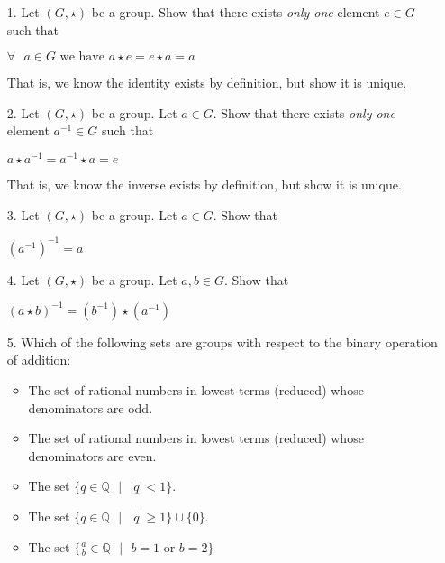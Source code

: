 \documentclass{article}
\begin{document}
  \begin{itemize}
  \item [1.] Let $(G,\star)$ be a group. Show that there exists \emph{only one} element $e\in{G}$ such that
    \begin{center}
      $\forall\text{ }a\in{G}\text{ we have }a\star{e}=e\star{a}=a$
    \end{center}
    That is, we know the identity exists by definition, but show it is unique.
  \item[2.] Let $(G, \star)$ be a group. Let $a\in{G}$. Show that there exists \emph{only one} element $a^{-1}\in{G}$ such that
    \begin{center}
      $a\star a^{-1} = a^{-1}\star {a} = e$
    \end{center}
    That is, we know the inverse exists by definition, but show it is unique.
  \item [3.] Let $(G, \star)$ be a group. Let $a\in{G}$. Show that
    \begin{center}
      $(a^{-1})^{-1} = a$
    \end{center}
  \item [4.] Let $(G, \star)$ be a group. Let $a,b\in{G}$. Show that
    \begin{center}
      $(a\star{b})^{-1} = (b^{-1})\star(a^{-1})$
    \end{center}
  \item [5.] Which of the following sets are groups with respect to the binary operation of addition:
    \begin{itemize}
    \item The set of rational numbers in lowest terms (reduced) whose denominators are odd.
    \item The set of rational numbers in lowest terms (reduced) whose denominators are even.
    \item The set $\{q\in\mathbb{Q}\text{ }\vert\text{ }|q| < 1\}$.
    \item The set $\{q\in\mathbb{Q}\text{ }\vert\text{ }|q| \ge 1\} \cup \{0\}$.
    \item The set $\{\frac{a}{b}\in\mathbb{Q}\text{ }\vert\text{ }b=1\text{ or }b=2\}$
    \end{itemize}
  \end{itemize}
  
\end{document}
